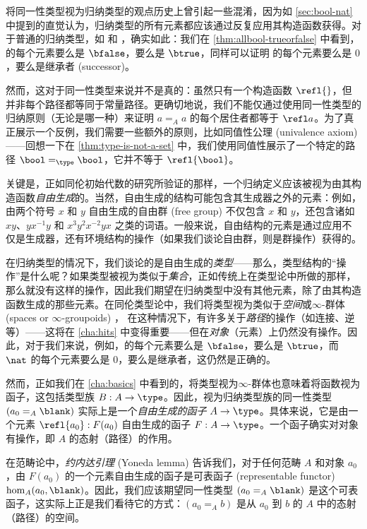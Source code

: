 将同一性类型视为归纳类型的观点历史上曾引起一些混淆，因为如 \cref{sec:bool-nat} 中提到的直觉认为，归纳类型的所有元素都应该通过反复应用其构造函数获得。对于普通的归纳类型，如 \bool 和 \nat，确实如此：我们在 \cref{thm:allbool-trueorfalse} 中看到，\bool 的每个元素要么是 $\bfalse$，要么是 $\btrue$，同样可以证明 \nat 的每个元素要么是 $0$，要么是继承者 (successor)。

然而，这对于同一性类型来说并不是真的：虽然只有一个构造函数 $\refl{}$，但并非每个路径都等同于常量路径。更确切地说，我们不能仅通过使用同一性类型的归纳原则（无论是哪一种）来证明 $a=_A a$ 的每个居住者都等于 $\refl a$。为了真正展示一个反例，我们需要一些额外的原则，比如同值性公理 (univalence axiom)——回想一下在 \cref{thm:type-is-not-a-set} 中，我们使用同值性展示了一个特定的路径 $\bool=_\type\bool$，它并不等于 $\refl{\bool}$。

%
%
关键是，正如同伦初始代数的研究所验证的那样，一个归纳定义应该被视为由其构造函数\emph{自由生成}的。当然，自由生成的结构可能包含其生成器之外的元素：例如，由两个符号 $x$ 和 $y$ 自由生成的自由群 (free group) 不仅包含 $x$ 和 $y$，还包含诸如 $xy$、$yx^{-1}y$ 和 $x^3y^2x^{-2}yx$ 之类的词语。一般来说，自由结构的元素是通过应用不仅是生成器，还有环境结构的操作（如果我们谈论自由群，则是群操作）获得的。

在归纳类型的情况下，我们谈论的是自由生成的\emph{类型}——那么，类型结构的“操作”是什么呢？如果类型被视为类似于\emph{集合}，正如传统上在类型论中所做的那样，那么就没有这样的操作，因此我们期望在归纳类型中没有其他元素，除了由其构造函数生成的那些元素。在同伦类型论中，我们将类型视为类似于\emph{空间}或$\infty$-群体 (spaces or $\infty$-groupoids) ，%
在这种情况下，有许多关于\emph{路径}的操作（如连接、逆等）——这将在 \cref{cha:hits} 中变得重要——但在\emph{对象}（元素）上仍然没有操作。因此，对于我们来说，例如，\bool 的每个元素要么是 $\bfalse$，要么是 $\btrue$，而 $\nat$ 的每个元素要么是 $0$，要么是继承者，这仍然是正确的。

然而，正如我们在 \cref{cha:basics} 中看到的，将类型视为$\infty$-群体也意味着将函数视为函子，这包括类型族 $B:A\to\type$。因此，视为归纳类型族的同一性类型 $(a_0 =_A \blank)$ 实际上是一个\emph{自由生成的函子} $A\to\type$。具体来说，它是由一个元素 $\refl{a_0}: F(a_0)$ 自由生成的函子 $F:A\to\type$。一个函子确实对对象有操作，即 $A$ 的态射（路径）的作用。

在范畴论中，\emph{约内达引理} (Yoneda lemma) 告诉我们，对于任何范畴 $A$ 和对象 $a_0$，由 $F(a_0)$ 的一个元素自由生成的函子是可表函子 (representable functor) $\hom_A(a_0,\blank)$。因此，我们应该期望同一性类型 $(a_0 =_A \blank)$ 是这个可表函子，这实际上正是我们看待它的方式：$(a_0 =_A b)$ 是从 $a_0$ 到 $b$ 的 $A$ 中的态射（路径）的空间。

